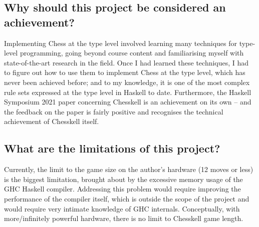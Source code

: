 \subsection{Why should this project be considered an achievement?}

Implementing Chess at the type level involved learning many techniques for type-level programming, going beyond course content and familiarising myself with state-of-the-art research in the field. Once I had learned these techniques, I had to figure out how to use them to implement Chess at the type level, which has never been achieved before; and to my knowledge, it is one of the most complex rule sets expressed at the type level in Haskell to date. Furthermore, the Haskell Symposium 2021 paper concerning Chesskell is an achievement on its own -- and the feedback on the paper is fairly positive and recognises the technical achievement of Chesskell itself.

\subsection{What are the limitations of this project?}

Currently, the limit to the game size on the author's hardware (12 moves or less) is the biggest limitation, brought about by the excessive memory usage of the GHC Haskell compiler. Addressing this problem would require improving the performance of the compiler itself, which is outside the scope of the project and would require very intimate knowledge of GHC internals. Conceptually, with more/infinitely powerful hardware, there is no limit to Chesskell game length.
